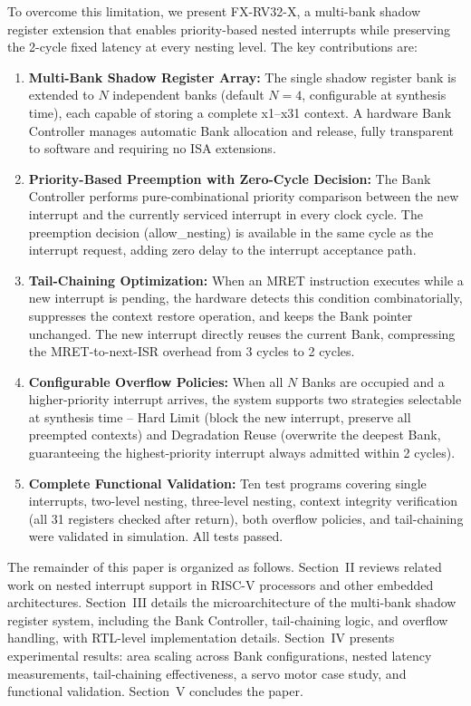 \documentclass[letterpaper,journal]{IEEEtran}
\begin{document}
To overcome this limitation, we present FX-RV32-X, a multi-bank shadow register extension that enables priority-based nested interrupts while preserving the 2-cycle fixed latency at every nesting level.
The key contributions are:

\begin{enumerate}
\item \textbf{Multi-Bank Shadow Register Array:} The single shadow register bank is extended to $N$ independent banks (default $N=4$, configurable at synthesis time), each capable of storing a complete x1--x31 context. A hardware Bank Controller manages automatic Bank allocation and release, fully transparent to software and requiring no ISA extensions.

\item \textbf{Priority-Based Preemption with Zero-Cycle Decision:} The Bank Controller performs pure-combinational priority comparison between the new interrupt and the currently serviced interrupt in every clock cycle. The preemption decision (allow\_nesting) is available in the same cycle as the interrupt request, adding zero delay to the interrupt acceptance path.

\item \textbf{Tail-Chaining Optimization:} When an MRET instruction executes while a new interrupt is pending, the hardware detects this condition combinatorially, suppresses the context restore operation, and keeps the Bank pointer unchanged. The new interrupt directly reuses the current Bank, compressing the MRET-to-next-ISR overhead from 3 cycles to 2 cycles.

\item \textbf{Configurable Overflow Policies:} When all $N$ Banks are occupied and a higher-priority interrupt arrives, the system supports two strategies selectable at synthesis time -- Hard Limit (block the new interrupt, preserve all preempted contexts) and Degradation Reuse (overwrite the deepest Bank, guaranteeing the highest-priority interrupt always admitted within 2 cycles).

\item \textbf{Complete Functional Validation:} Ten test programs covering single interrupts, two-level nesting, three-level nesting, context integrity verification (all 31 registers checked after return), both overflow policies, and tail-chaining were validated in simulation. All tests passed.
\end{enumerate}

The remainder of this paper is organized as follows.
Section~II reviews related work on nested interrupt support in RISC-V processors and other embedded architectures.
Section~III details the microarchitecture of the multi-bank shadow register system, including the Bank Controller, tail-chaining logic, and overflow handling, with RTL-level implementation details.
Section~IV presents experimental results: area scaling across Bank configurations, nested latency measurements, tail-chaining effectiveness, a servo motor case study, and functional validation.
Section~V concludes the paper.
\end{document}
